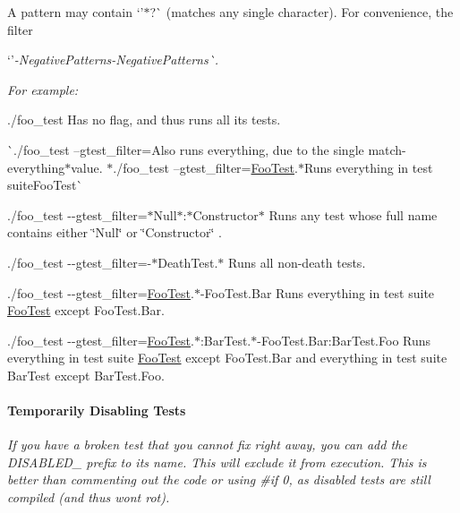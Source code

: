 A pattern may contain `'$\ast$\textquotesingle{}?\textquotesingle{}\`{} (matches any single character). For convenience, the filter

`'{\itshape -\/Negative\+Patterns\textquotesingle{}-\/Negative\+Patterns\textquotesingle{}\`{}.}

{\itshape For example\+:}

{\itshape 
\begin{DoxyItemize}
\item {\ttfamily ./foo\+\_\+test} Has no flag, and thus runs all its tests.
\item \`{}./foo\+\_\+test --gtest\+\_\+filter={\ttfamily Also runs everything, due to the single match-\/everything}$\ast${\ttfamily value. $\ast$}./foo\+\_\+test --gtest\+\_\+filter=\mbox{\hyperlink{class_foo_test}{Foo\+Test}}.$\ast${\ttfamily Runs everything in test suite}Foo\+Test\`{}
\item {\ttfamily ./foo\+\_\+test -\/-\/gtest\+\_\+filter=$\ast$\+Null$\ast$\+:$\ast$\+Constructor$\ast$} Runs any test whose full name contains either {\ttfamily \char`\"{}\+Null\char`\"{}} or {\ttfamily \char`\"{}\+Constructor\char`\"{}} .
\item {\ttfamily ./foo\+\_\+test -\/-\/gtest\+\_\+filter=-\/$\ast$\+Death\+Test.$\ast$} Runs all non-\/death tests.
\item {\ttfamily ./foo\+\_\+test -\/-\/gtest\+\_\+filter=\mbox{\hyperlink{class_foo_test}{Foo\+Test}}.$\ast$-\/\+Foo\+Test.Bar} Runs everything in test suite {\ttfamily \mbox{\hyperlink{class_foo_test}{Foo\+Test}}} except {\ttfamily Foo\+Test.\+Bar}.
\item {\ttfamily ./foo\+\_\+test -\/-\/gtest\+\_\+filter=\mbox{\hyperlink{class_foo_test}{Foo\+Test}}.$\ast$\+:Bar\+Test.$\ast$-\/\+Foo\+Test.Bar\+:Bar\+Test.\+Foo} Runs everything in test suite {\ttfamily \mbox{\hyperlink{class_foo_test}{Foo\+Test}}} except {\ttfamily Foo\+Test.\+Bar} and everything in test suite {\ttfamily Bar\+Test} except {\ttfamily Bar\+Test.\+Foo}.
\end{DoxyItemize}}

{\itshape \paragraph*{Temporarily Disabling Tests}}

{\itshape }

{\itshape If you have a broken test that you cannot fix right away, you can add the {\ttfamily D\+I\+S\+A\+B\+L\+E\+D\+\_\+} prefix to its name. This will exclude it from execution. This is better than commenting out the code or using {\ttfamily \#if 0}, as disabled tests are still compiled (and thus won\textquotesingle{}t rot).}

